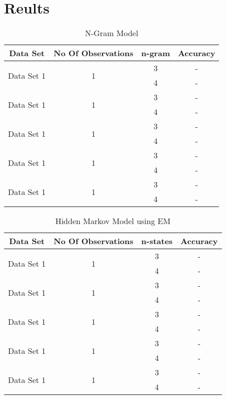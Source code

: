 \documentclass{article} %
\begin{document}
\section{Reults}

\begin{table}[t]
\caption{N-Gram Model}
\label{N-Gram_model}
\begin{center}
\begin{tabular}{ |c|c|c|c| }
\hline
\multicolumn{1}{|c|}{\bf Data Set} &\multicolumn{1}{|c|}{\bf No Of Observations} &\multicolumn{1}{|c|}{\bf n-gram} &\multicolumn{1}{|c|}{\bf Accuracy}\\
\hline
\multirow{2}{*}{Data Set 1}& \multirow{2}{*}{1} & 3 & - \\
& & 4 & - \\
\hline
\multirow{2}{*}{Data Set 1}& \multirow{2}{*}{1} & 3 & - \\
& & 4 & - \\
\hline
\multirow{2}{*}{Data Set 1}& \multirow{2}{*}{1} & 3 & - \\
& & 4 & - \\
\hline
\multirow{2}{*}{Data Set 1}& \multirow{2}{*}{1} & 3 & - \\
& & 4 & - \\
\hline
\multirow{2}{*}{Data Set 1}& \multirow{2}{*}{1} & 3 & - \\
& & 4 & - \\
\hline
\end{tabular}
\end{center}
\end{table}


\begin{table}[t]
\caption{Hidden Markov Model using EM}
\label{HMM_EM}
\begin{center}
\begin{tabular}{ |c|c|c|c| }
\hline
\multicolumn{1}{|c|}{\bf Data Set} &\multicolumn{1}{|c|}{\bf No Of Observations} &\multicolumn{1}{|c|}{\bf n-states} &\multicolumn{1}{|c|}{\bf Accuracy}\\
\hline
\multirow{2}{*}{Data Set 1}& \multirow{2}{*}{1} & 3 & - \\
& & 4 & - \\
\hline
\multirow{2}{*}{Data Set 1}& \multirow{2}{*}{1} & 3 & - \\
& & 4 & - \\
\hline
\multirow{2}{*}{Data Set 1}& \multirow{2}{*}{1} & 3 & - \\
& & 4 & - \\
\hline
\multirow{2}{*}{Data Set 1}& \multirow{2}{*}{1} & 3 & - \\
& & 4 & - \\
\hline
\multirow{2}{*}{Data Set 1}& \multirow{2}{*}{1} & 3 & - \\
& & 4 & - \\
\hline
\end{tabular}
\end{center}
\end{table}
\end{document}
